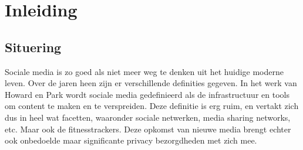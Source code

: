 
\chapter{Inleiding}

\section{Situering}
Sociale media is zo goed als niet meer weg te denken uit het huidige moderne
leven. Over de jaren heen zijn er verschillende definities gegeven. In het werk
van Howard en Park wordt sociale media gedefinieerd als de infrastructuur en
tools om content te maken en te verspreiden\cite{PhilipsAndParks}. Deze
definitie is erg ruim, en vertakt zich dus in heel wat facetten, waaronder
sociale netwerken, media sharing networks, etc. Maar ook de fitnesstrackers.
Deze opkomst van nieuwe media brengt echter ook onbedoelde maar significante
privacy bezorgdheden met zich mee.

